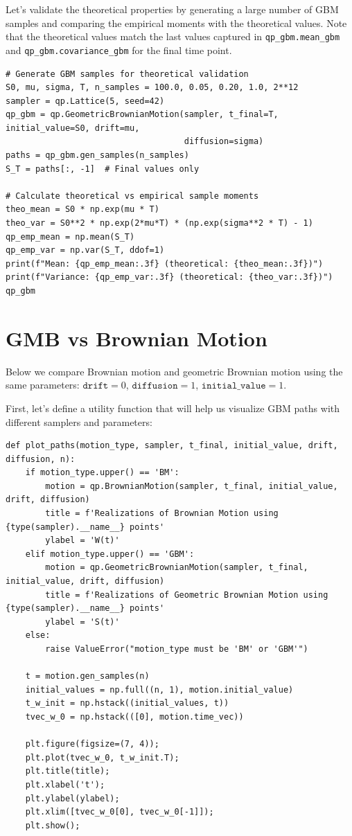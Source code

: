 \documentclass{article}
\begin{document}
Let's validate the  theoretical properties by generating a large number of GBM samples and comparing the empirical moments with the theoretical values. Note that the theoretical values match the last values captured in \texttt{qp\_gbm.mean\_gbm} and \texttt{qp\_gbm.covariance\_gbm} for the final time point.

\begin{verbatim}
# Generate GBM samples for theoretical validation
S0, mu, sigma, T, n_samples = 100.0, 0.05, 0.20, 1.0, 2**12
sampler = qp.Lattice(5, seed=42)
qp_gbm = qp.GeometricBrownianMotion(sampler, t_final=T, initial_value=S0, drift=mu, 
                                    diffusion=sigma)
paths = qp_gbm.gen_samples(n_samples)
S_T = paths[:, -1]  # Final values only

# Calculate theoretical vs empirical sample moments
theo_mean = S0 * np.exp(mu * T)
theo_var = S0**2 * np.exp(2*mu*T) * (np.exp(sigma**2 * T) - 1)
qp_emp_mean = np.mean(S_T)
qp_emp_var = np.var(S_T, ddof=1) 
print(f"Mean: {qp_emp_mean:.3f} (theoretical: {theo_mean:.3f})")
print(f"Variance: {qp_emp_var:.3f} (theoretical: {theo_var:.3f})")
qp_gbm
\end{verbatim}

\section{GMB vs Brownian Motion}

Below we compare Brownian motion and geometric Brownian motion using the same parameters: $\texttt{drift} = 0$, $\texttt{diffusion} = 1$, $\texttt{initial\_value} = 1$.


First, let's define a utility function that will help us visualize GBM paths with different samplers and parameters:


\begin{verbatim}
def plot_paths(motion_type, sampler, t_final, initial_value, drift, diffusion, n):
    if motion_type.upper() == 'BM':
        motion = qp.BrownianMotion(sampler, t_final, initial_value, drift, diffusion)
        title = f'Realizations of Brownian Motion using {type(sampler).__name__} points'
        ylabel = 'W(t)'
    elif motion_type.upper() == 'GBM':
        motion = qp.GeometricBrownianMotion(sampler, t_final, initial_value, drift, diffusion)
        title = f'Realizations of Geometric Brownian Motion using {type(sampler).__name__} points'
        ylabel = 'S(t)'
    else:
        raise ValueError("motion_type must be 'BM' or 'GBM'")
    
    t = motion.gen_samples(n)
    initial_values = np.full((n, 1), motion.initial_value)
    t_w_init = np.hstack((initial_values, t))
    tvec_w_0 = np.hstack(([0], motion.time_vec))

    plt.figure(figsize=(7, 4));
    plt.plot(tvec_w_0, t_w_init.T); 
    plt.title(title);
    plt.xlabel('t');
    plt.ylabel(ylabel);
    plt.xlim([tvec_w_0[0], tvec_w_0[-1]]);
    plt.show();
\end{verbatim}
\end{document}

